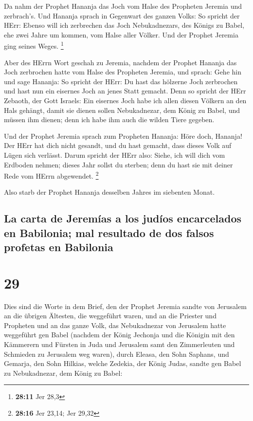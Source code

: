  Da nahm der Prophet Hananja das Joch vom Halse des
Propheten Jeremia und zerbrach's.  Und Hananja sprach in
Gegenwart des ganzen Volks: So spricht der HErr: Ebenso will ich
zerbrechen das Joch Nebukadnezars, des Königs zu Babel, ehe zwei Jahre
um kommen, vom Halse aller Völker. Und der Prophet Jeremia ging seines
Weges. \footnote{\textbf{28:11} Jer 28,3}

 Aber des HErrn Wort geschah zu Jeremia, nachdem der
Prophet Hananja das Joch zerbrochen hatte vom Halse des Propheten
Jeremia, und sprach:  Gehe hin und sage Hananja: So
spricht der HErr: Du hast das hölzerne Joch zerbrochen und hast nun ein
eisernes Joch an jenes Statt gemacht.  Denn so spricht
der HErr Zebaoth, der Gott Israels: Ein eisernes Joch habe ich allen
diesen Völkern an den Hals gehängt, damit sie dienen sollen
Nebukadnezar, dem König zu Babel, und müssen ihm dienen; denn ich habe
ihm auch die wilden Tiere gegeben.

 Und der Prophet Jeremia sprach zum Propheten Hananja:
Höre doch, Hananja! Der HErr hat dich nicht gesandt, und du hast
gemacht, dass dieses Volk auf Lügen sich verlässt.  Darum
spricht der HErr also: Siehe, ich will dich vom Erdboden nehmen; dieses
Jahr sollst du sterben; denn du hast sie mit deiner Rede vom HErrn
abgewendet. \footnote{\textbf{28:16} Jer 23,14; Jer 29,32}

 Also starb der Prophet Hananja desselben Jahres im
siebenten Monat.

\hypertarget{la-carta-de-jeremuxedas-a-los-juduxedos-encarcelados-en-babilonia-mal-resultado-de-dos-falsos-profetas-en-babilonia}{%
\subsection{La carta de Jeremías a los judíos encarcelados en Babilonia;
mal resultado de dos falsos profetas en
Babilonia}\label{la-carta-de-jeremuxedas-a-los-juduxedos-encarcelados-en-babilonia-mal-resultado-de-dos-falsos-profetas-en-babilonia}}

\hypertarget{section-28}{%
\section{29}\label{section-28}}

 Dies sind die Worte in dem Brief, den der Prophet Jeremia
sandte von Jerusalem an die übrigen Ältesten, die weggeführt waren, und
an die Priester und Propheten und an das ganze Volk, das Nebukadnezar
von Jerusalem hatte weggeführt gen Babel  (nachdem der
König Jechonja und die Königin mit den Kämmerern und Fürsten in Juda und
Jerusalem samt den Zimmerleuten und Schmieden zu Jerusalem weg waren),
 durch Eleasa, den Sohn Saphans, und Gemarja, den Sohn
Hilkias, welche Zedekia, der König Judas, sandte gen Babel zu
Nebukadnezar, dem König zu Babel:

